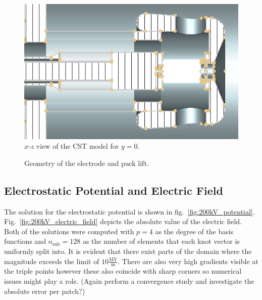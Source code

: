 \begin{center}
\begin{figure}[H]
  \includegraphics[width=\textwidth]{figures/200kV/v1_cuty}
  \caption{$x$-$z$ view of the CST model for $y=0$.}
  \label{fig:cst_geometry_xz}
\end{figure}
\end{center}

\begin{center}
\begin{figure}[H]
  
  \caption{Geometry of the electrode and puck lift.}
  \label{fig:geometry_electrode}
\end{figure}
\end{center}

\subsection{Electrostatic Potential and Electric Field}
The solution for the electrostatic potential is shown in fig.~\ref{fig:200kV_potential}. Fig.~\ref{fig:200kV_electric_field} depicts the absolute value of the electric field.
Both of the solutions were computed with $p=4$ as the degree of the basis functions and $n_\mathrm{sub}=128$ as the number of elements that each knot vector is uniformly split into.
It is evident that there exist parts of the domain where the magnitude exceeds the limit of $10 \frac{\mathrm{MV}}{\mathrm{m}}$. There are also very high gradients visible at the triple points however these also coincide with sharp corners so numerical issues might play a role. (Again perform a convergence study and investigate the absolute error per patch?)

